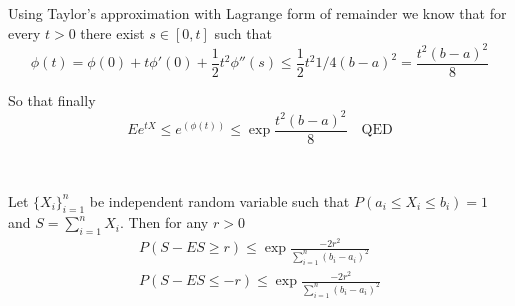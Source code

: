 Using Taylor's approximation with Lagrange form of remainder we know that for every $t >0$ there exist $s \in [0,t]$ such that
\begin{equation*}
\phi(t) = \phi(0) + t\phi'(0) + \frac{1}{2} t^2 \phi''(s) \leq \frac{1}{2} t^2 1/4 (b-a)^2 = \frac{t^2 (b-a)^2}{8}
\end{equation*}

So that finally
\begin{equation*}
E e^{tX} \leq e^(\phi(t)) \leq \exp \frac{t^2 (b-a)^2}{8} \quad \text{QED}
\end{equation*}

\ \\

\begin{theorem}
Let $\{X_i\}_{i=1}^n$ be independent random variable such that $P(a_i \leq X_i \leq b_i) = 1$ and $S = \sum_{i=1}^n X_i$. Then for any $r > 0$
\begin{eqnarray*}
P(S - E S \geq r) \leq \exp \frac{-2r^2}{\sum_{i=1}^n (b_i - a_i)^2} \\
P(S - E S \leq -r) \leq \exp \frac{-2r^2}{\sum_{i=1}^n (b_i - a_i)^2}
\end{eqnarray*}
\end{theorem}


